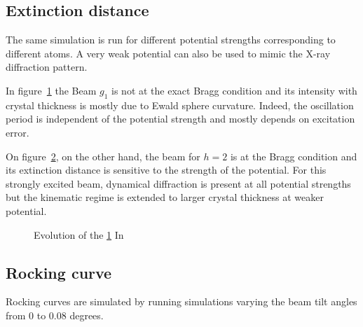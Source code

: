 \subsection{Extinction distance}

The same simulation is run for different potential strengths corresponding to different atoms. A very weak potential can also be used to mimic the X-ray diffraction pattern.

In figure~\ref{fig:2_beam_I1} the Beam $g_1$ is not at the exact Bragg condition and its intensity with crystal thickness is mostly due to Ewald sphere curvature. Indeed, the oscillation period is independent of the potential strength and mostly depends on excitation error.

On figure~\ref{fig:2_beam_I2}, on the other hand, the beam for $h=2$ is at the Bragg condition and its extinction distance is sensitive to the strength of the potential.
For this strongly excited beam, dynamical diffraction is present at all potential strengths but the kinematic regime is extended to larger crystal thickness at weaker potential.

\begin{figure}[h!]
	\begin{subfigure}{\textwidth}
		\centering
		\begin{subfigure}{0.3\textwidth}
			\centering
      \def\svgwidth{\columnwidth}
			
			\caption{}\label{fig:2_beam_I1}
		\end{subfigure}
		\begin{subfigure}{0.3\textwidth}
			\centering
      \def\svgwidth{\columnwidth}
			
			\caption{}\label{fig:2_beam_I2}
		\end{subfigure}
		\begin{subfigure}{0.3\textwidth}
			\centering
      \def\svgwidth{\columnwidth}
			
			\caption{}\label{fig:2_beam_xi}
		\end{subfigure}
  \end{subfigure}
	\caption[2-beam extinction]{
    Evolution of the
		\ref{fig:2_beam_I1} In
	}\label{fig:2_beam_zeta}
\end{figure}


\subsection{Rocking curve}
Rocking curves are simulated by running simulations varying the beam tilt angles from 0 to 0.08 degrees.

